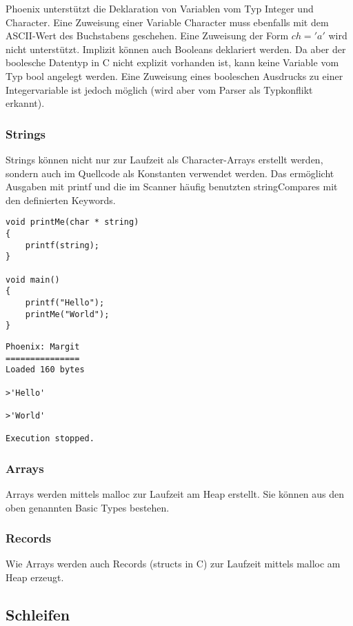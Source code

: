 \documentclass[a4paper,12pt]{article}
\begin{document}
	Phoenix unterstützt die Deklaration von Variablen vom Typ Integer und Character.
	Eine Zuweisung einer Variable Character muss ebenfalls mit dem ASCII-Wert des Buchstabens geschehen.
	Eine Zuweisung der Form $ch='a'$ wird nicht unterstützt.
	Implizit können auch Booleans deklariert werden.
	Da aber der boolesche Datentyp in C nicht explizit vorhanden ist, kann keine Variable vom Typ bool angelegt werden.
	Eine Zuweisung eines booleschen Ausdrucks zu einer Integervariable ist jedoch möglich (wird aber vom Parser als Typkonflikt erkannt).

	\subsubsection{Strings}

	Strings können nicht nur zur Laufzeit als Character-Arrays erstellt werden, sondern auch im Quellcode als Konstanten verwendet werden.
	Das ermöglicht Ausgaben mit printf und die im Scanner häufig benutzten stringCompares mit den definierten Keywords.

	\begin{lstlisting}[title=string.c,frame=single]
void printMe(char * string)
{
	printf(string);
}

void main()
{
	printf("Hello");
	printMe("World");
}	\end{lstlisting}

	\begin{lstlisting}[title=Ausgabe der Target Machine,frame=single]
Phoenix: Margit
===============
Loaded 160 bytes

>'Hello'

>'World'

Execution stopped.
	\end{lstlisting}

	\subsubsection{Arrays}

	Arrays werden mittels malloc zur Laufzeit am Heap erstellt.
	Sie können aus den oben genannten Basic Types bestehen.

	\subsubsection{Records}

	Wie Arrays werden auch Records (structs in C) zur Laufzeit mittels malloc am Heap erzeugt.

	\subsection{Schleifen}
\end{document}
